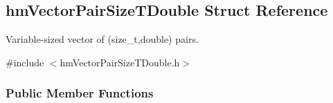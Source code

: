 \hypertarget{structhm_vector_pair_size_t_double}{\subsection{hm\-Vector\-Pair\-Size\-T\-Double Struct Reference}
\label{structhm_vector_pair_size_t_double}
}


Variable-\/sized vector of (size\-\_\-t,double) pairs.  




{\ttfamily \#include $<$hm\-Vector\-Pair\-Size\-T\-Double.\-h$>$}

\subsubsection*{Public Member Functions}

